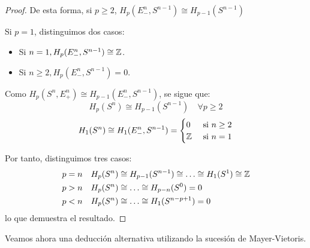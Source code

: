 \begin{proof}
  De esta forma, si $p \geq 2$, $H_p(E_-^n, S^{n-1}) \cong H_{p-1}(S^{n-1})$

  Si $p = 1$, distinguimos dos casos:

  \begin{itemize}
    \item Si $n = 1, H_p(E_-^n, S^{n-1}) \cong \mathbb{Z}$.
    \item Si $n \geq 2, H_p(E_-^n, S^{n-1}) = 0$.
  \end{itemize}

  Como $H_p(S^n, E_+^n) \cong H_{p-1}(E_-^n, S^{n-1})$, se sigue que:
  \[ H_p(S^n) \cong H_{p-1}(S^{n-1}) \quad \forall p \geq 2 \]
  \[ H_1(S^n) \cong H_1(E_-^n, S^{n-1}) = \begin{cases} 0 &\text{ si } n \geq 2 \\ \mathbb{Z} &\text{ si } n = 1 \end{cases} \]

  Por tanto, distinguimos tres casos:
  \begin{align*}
      p = n &\quad H_p(S^n) \cong H_{p-1}(S^{n-1}) \cong \dots \cong H_1(S^1) \cong \mathbb{Z} \\
      p > n &\quad H_p(S^n) \cong \dots \cong H_{p-n}(S^0) = 0 \\
      p < n &\quad H_p(S^n) \cong \dots \cong H_1(S^{n-p+1}) = 0
  \end{align*}
  lo que demuestra el resultado.
\end{proof}

Veamos ahora una deducción alternativa utilizando la sucesión de Mayer-Vietoris.

